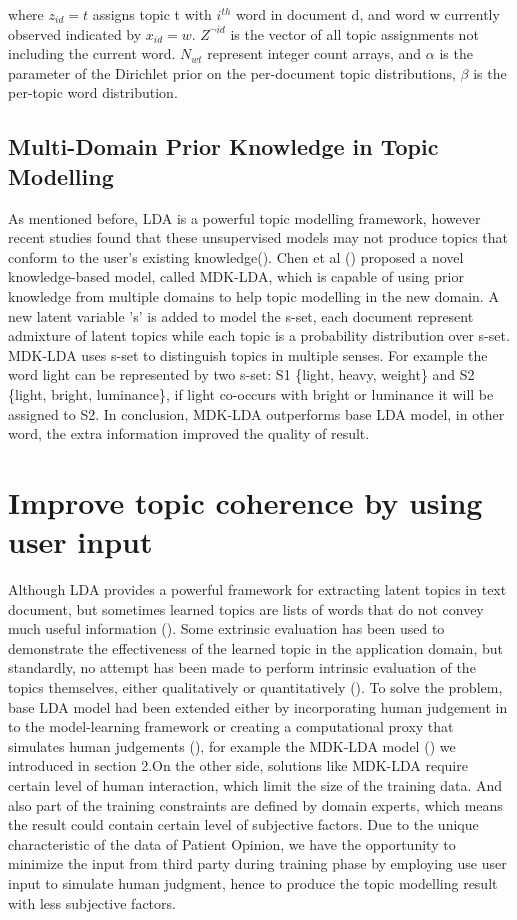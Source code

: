 \documentclass[11pt,twoside]{report}
\begin{document}
where $z_{id}=t$ assigns topic t with $i^{th}$ word in document d, and word w currently observed indicated by $x_{id}=w$.
$Z^{\neg id}$ is the vector of all topic assignments not including the current word. $N_{wt}$ represent integer count arrays, and $\alpha$ is the parameter of the Dirichlet prior on the per-document topic distributions, $\beta$ is the per-topic word distribution.

\section{Multi-Domain Prior Knowledge in Topic Modelling}
As mentioned before, LDA is a powerful topic modelling framework, however recent studies found that these unsupervised models may not produce topics that conform to the user's existing knowledge(\cite{ref24}). Chen et al (\cite{ref24}) proposed a novel knowledge-based model, called MDK-LDA, which is capable of using prior knowledge from multiple domains to help topic modelling in the new domain. A new latent variable 's' is added to model the s-set, each document represent admixture of latent topics while each topic is a probability distribution over s-set. MDK-LDA uses s-set to distinguish topics in multiple senses. For example the word light can be represented by two s-set: S1 \{light, heavy, weight\} and S2 \{light, bright, luminance\}, if light co-occurs with bright or luminance it will be assigned to S2.
In conclusion, MDK-LDA outperforms base LDA model, in other word, the extra information improved the quality of result. 

\chapter{Improve topic coherence by using user input}

Although LDA provides a powerful framework for extracting latent topics in text document, but sometimes learned topics are lists of words that do not convey much useful information (\cite{ref26}). Some extrinsic evaluation has been used to demonstrate the effectiveness of the learned topic in the application domain, but standardly, no attempt has been made to perform intrinsic evaluation of the topics themselves, either qualitatively or quantitatively (\cite{ref27}). To solve the problem, base LDA model had been extended either by incorporating human judgement in to the model-learning framework or creating a computational proxy that simulates human judgements (\cite{ref28}), for example the MDK-LDA model (\cite{ref24}) we introduced in section 2.On the other side, solutions like MDK-LDA require certain level of human interaction, which limit the size of the training data. And also part of the training constraints are defined by domain experts, which means the result could contain certain level of subjective factors.
Due to the unique characteristic of the data of Patient Opinion, we have the opportunity to minimize the input from third party during training phase by employing use user input to simulate human judgment, hence to produce the topic modelling result with less subjective factors.
\end{document}
